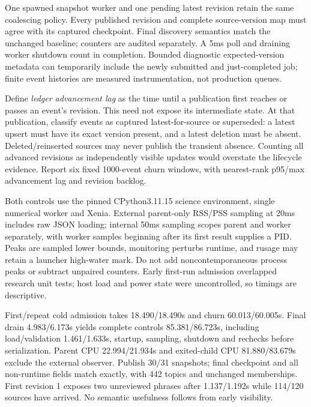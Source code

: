 \documentclass[11pt]{article}
\begin{document}
One spawned snapshot worker and one pending latest revision retain the same
coalescing policy. Every published revision and complete source-version map
must agree with its captured checkpoint. Final discovery semantics match the
unchanged baseline; counters are audited separately. A 5ms poll and draining
worker shutdown count in completion. Bounded diagnostic expected-version metadata
can temporarily include the newly submitted and just-completed job; finite
event histories are measured instrumentation, not production queues.

Define \emph{ledger advancement lag} as the time until a publication first
reaches or passes an event's revision. This need not expose its intermediate
state. At that publication, classify events as captured latest-for-source or
superseded: a latest upsert must have its exact version present, and a latest
deletion must be absent. Deleted/reinserted sources may never publish the
transient absence. Counting all advanced revisions as independently visible
updates would overstate the lifecycle evidence. Report six fixed 1000-event
churn windows, with nearest-rank p95/max advancement lag and revision backlog.

Both controls use the pinned CPython3.11.15 science environment, single numerical
worker and Xenia. External parent-only RSS/PSS sampling at 20ms includes raw
JSON loading; internal 50ms sampling scopes parent and worker separately, with
worker samples beginning after its first result supplies a PID. Peaks are
sampled lower bounds, monitoring perturbs runtime, and rusage may retain a
launcher high-water mark. Do not add noncontemporaneous process peaks or subtract
unpaired counters. Early first-run admission overlapped research unit tests;
host load and power state were uncontrolled, so timings are descriptive.

First/repeat cold admission takes 18.490/18.490s and churn 60.013/60.005s.
Final drain 4.983/6.173s yields complete controls 85.381/86.723s, including
load/validation 1.461/1.633s, startup, sampling, shutdown and rechecks before
serialization. Parent CPU 22.994/21.934s and exited-child CPU 81.880/83.679s
exclude the external observer. Publish 30/31 snapshots; final checkpoint and
all non-runtime fields match exactly, with 442 topics and unchanged memberships.
First revision 1 exposes two unreviewed phrases after 1.137/1.192s while 114/120
sources have arrived. No semantic usefulness follows from early visibility.
\end{document}
